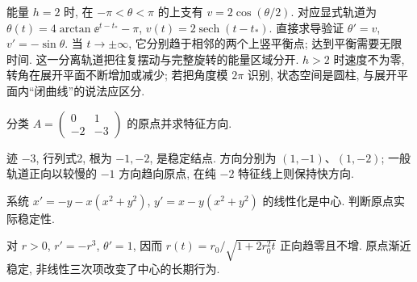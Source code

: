 能量 $h=2$ 时, 在 $-\pi<\theta<\pi$ 的上支有 $v=2\cos(\theta/2)$. 对应显式轨道为 $\theta(t)=4\arctan\ee^{t-t_*}-\pi$, $v(t)=2\operatorname{sech}(t-t_*)$. 直接求导验证 $\theta'=v$, $v'=-\sin\theta$. 当 $t\to\pm\infty$, 它分别趋于相邻的两个上竖平衡点; 达到平衡需要无限时间. 这一分离轨道把往复摆动与完整旋转的能量区域分开. $h>2$ 时速度不为零, 转角在展开平面不断增加或减少; 若把角度模 $2\pi$ 识别, 状态空间是圆柱, 与展开平面内“闭曲线”的说法应区分.

\begin{exercise}分类 $A=\begin{pmatrix}0&1\\-2&-3\end{pmatrix}$ 的原点并求特征方向.\end{exercise}
\begin{solution}迹 $-3$, 行列式2, 根为 $-1,-2$, 是稳定结点. 方向分别为 $(1,-1)$、$(1,-2)$; 一般轨道正向以较慢的 $-1$ 方向趋向原点, 在纯 $-2$ 特征线上则保持快方向.\end{solution}
\begin{exercise}系统 $x'=-y-x(x^2+y^2)$, $y'=x-y(x^2+y^2)$ 的线性化是中心. 判断原点实际稳定性.\end{exercise}
\begin{solution}对 $r>0$, $r'=-r^3$, $\theta'=1$, 因而 $r(t)=r_0/\sqrt{1+2r_0^2t}$ 正向趋零且不增. 原点渐近稳定, 非线性三次项改变了中心的长期行为.\end{solution}
